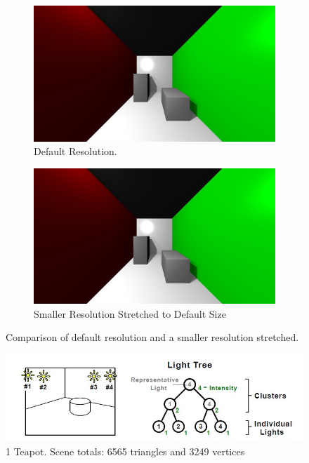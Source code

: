 \begin{figure}
        \centering
        \begin{subfigure}[b]{1.0\textwidth}
                \includegraphics[width=\textwidth]{sample1.jpg}
                \caption{Default Resolution.}
                \label{fig:defaultresolution}
        \end{subfigure}
        \begin{subfigure}[b]{1.0\textwidth}
                \includegraphics[width=\textwidth]{17_resize.jpg}
                \caption{Smaller Resolution Stretched to Default Size}
                \label{fig:smallerresolution}
        \end{subfigure}
        \caption{Comparison of default resolution and a smaller resolution stretched.}\label{fig:artifacts}
\end{figure}


\begin{figure}[h!]
  \centering
    \includegraphics[width=1.0\textwidth]{lightTree.jpg}
  \caption{1 Teapot. Scene totals: 6565 triangles and 3249 vertices}
	\label{fig:teapot}
\end{figure}

